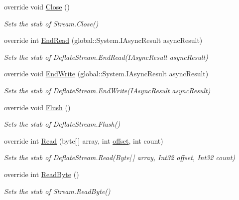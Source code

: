 \begin{DoxyCompactItemize}
override void \hyperlink{class_system_1_1_i_o_1_1_compression_1_1_fakes_1_1_stub_deflate_stream_a7e8b4c9e08241e1c5441ba91dca0584a}{Close} ()
\begin{DoxyCompactList}\small\item\em Sets the stub of Stream.\-Close()\end{DoxyCompactList}\item 
override int \hyperlink{class_system_1_1_i_o_1_1_compression_1_1_fakes_1_1_stub_deflate_stream_ab92efff52ee00397834ed23d0475d16d}{End\-Read} (global\-::\-System.\-I\-Async\-Result async\-Result)
\begin{DoxyCompactList}\small\item\em Sets the stub of Deflate\-Stream.\-End\-Read(\-I\-Async\-Result async\-Result)\end{DoxyCompactList}\item 
override void \hyperlink{class_system_1_1_i_o_1_1_compression_1_1_fakes_1_1_stub_deflate_stream_a266079ca91ce8dd72d7c264cd4c4731c}{End\-Write} (global\-::\-System.\-I\-Async\-Result async\-Result)
\begin{DoxyCompactList}\small\item\em Sets the stub of Deflate\-Stream.\-End\-Write(\-I\-Async\-Result async\-Result)\end{DoxyCompactList}\item 
override void \hyperlink{class_system_1_1_i_o_1_1_compression_1_1_fakes_1_1_stub_deflate_stream_a4494dd6b8b49454cdc1fb198c66cf4d0}{Flush} ()
\begin{DoxyCompactList}\small\item\em Sets the stub of Deflate\-Stream.\-Flush()\end{DoxyCompactList}\item 
override int \hyperlink{class_system_1_1_i_o_1_1_compression_1_1_fakes_1_1_stub_deflate_stream_acfbb56b218ea7f3a9e468be7725c5d9f}{Read} (byte\mbox{[}$\,$\mbox{]} array, int \hyperlink{jquery-1_810_82_8js_a4a9f594d20d927164551fc7fa4751a2f}{offset}, int count)
\begin{DoxyCompactList}\small\item\em Sets the stub of Deflate\-Stream.\-Read(\-Byte\mbox{[}$\,$\mbox{]} array, Int32 offset, Int32 count)\end{DoxyCompactList}\item 
override int \hyperlink{class_system_1_1_i_o_1_1_compression_1_1_fakes_1_1_stub_deflate_stream_a7f6ebed90ab5430ba36a2814a5d3e76a}{Read\-Byte} ()
\begin{DoxyCompactList}\small\item\em Sets the stub of Stream.\-Read\-Byte()\end{DoxyCompactList}\item 

\end{DoxyCompactItemize}
